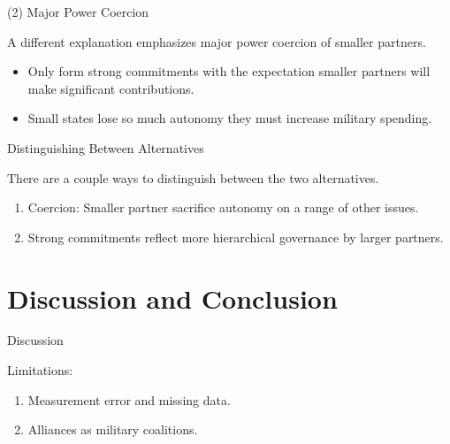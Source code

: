 \documentclass{beamer}
\begin{document}

\begin{frame}{(2) Major Power Coercion} 

A different explanation emphasizes major power coercion of smaller partners. 
\pause

\begin{itemize}
\item Only form strong commitments with the expectation smaller partners will make significant contributions. 
\pause
\item Small states lose so much autonomy they must increase military spending. 
\end{itemize}


\end{frame}


\begin{frame}{Distinguishing Between Alternatives} 

There are a couple ways to distinguish between the two alternatives. 
\pause

\begin{enumerate}
\item Coercion: Smaller partner sacrifice autonomy on a range of other issues. 
\pause
\item Strong commitments reflect more hierarchical governance by larger partners. 
\end{enumerate} 

\end{frame}


\section{Discussion and Conclusion}


\begin{frame}{Discussion}

\pause 
Limitations:
\pause
\begin{enumerate}
\item Measurement error and missing data. 
\pause 
\item Alliances as military coalitions. 
\end{enumerate}

\end{frame}
\end{document}

